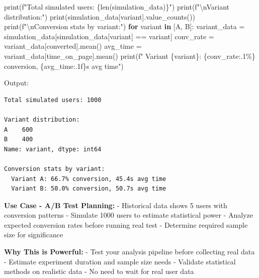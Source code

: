 \documentclass[
  letterpaper,
]{scrbook}
\newenvironment{Shaded}{\begin{snugshade}}{\end{snugshade}}
\newcommand{\BuiltInTok}[1]{\textcolor[rgb]{0.00,0.23,0.31}{#1}}
\newcommand{\CharTok}[1]{\textcolor[rgb]{0.13,0.47,0.30}{#1}}
\newcommand{\ControlFlowTok}[1]{\textcolor[rgb]{0.00,0.23,0.31}{\textbf{#1}}}
\newcommand{\KeywordTok}[1]{\textcolor[rgb]{0.00,0.23,0.31}{\textbf{#1}}}
\newcommand{\NormalTok}[1]{\textcolor[rgb]{0.00,0.23,0.31}{#1}}
\newcommand{\OperatorTok}[1]{\textcolor[rgb]{0.37,0.37,0.37}{#1}}
\newcommand{\SpecialCharTok}[1]{\textcolor[rgb]{0.37,0.37,0.37}{#1}}
\newcommand{\SpecialStringTok}[1]{\textcolor[rgb]{0.13,0.47,0.30}{#1}}
\newcommand{\StringTok}[1]{\textcolor[rgb]{0.13,0.47,0.30}{#1}}
\begin{document}
\begin{Shaded}
\begin{Highlighting}[]
\BuiltInTok{print}\NormalTok{(}\SpecialStringTok{f"Total simulated users: }\SpecialCharTok{\{}\BuiltInTok{len}\NormalTok{(simulation\_data)}\SpecialCharTok{\}}\SpecialStringTok{"}\NormalTok{)}
\BuiltInTok{print}\NormalTok{(}\SpecialStringTok{f"}\CharTok{\textbackslash{}n}\SpecialStringTok{Variant distribution:"}\NormalTok{)}
\BuiltInTok{print}\NormalTok{(simulation\_data[}\StringTok{\textquotesingle{}variant\textquotesingle{}}\NormalTok{].value\_counts())}
\BuiltInTok{print}\NormalTok{(}\SpecialStringTok{f"}\CharTok{\textbackslash{}n}\SpecialStringTok{Conversion stats by variant:"}\NormalTok{)}
\ControlFlowTok{for}\NormalTok{ variant }\KeywordTok{in}\NormalTok{ [}\StringTok{\textquotesingle{}A\textquotesingle{}}\NormalTok{, }\StringTok{\textquotesingle{}B\textquotesingle{}}\NormalTok{]:}
\NormalTok{    variant\_data }\OperatorTok{=}\NormalTok{ simulation\_data[simulation\_data[}\StringTok{\textquotesingle{}variant\textquotesingle{}}\NormalTok{] }\OperatorTok{==}\NormalTok{ variant]}
\NormalTok{    conv\_rate }\OperatorTok{=}\NormalTok{ variant\_data[}\StringTok{\textquotesingle{}converted\textquotesingle{}}\NormalTok{].mean()}
\NormalTok{    avg\_time }\OperatorTok{=}\NormalTok{ variant\_data[}\StringTok{\textquotesingle{}time\_on\_page\textquotesingle{}}\NormalTok{].mean()}
    \BuiltInTok{print}\NormalTok{(}\SpecialStringTok{f"  Variant }\SpecialCharTok{\{}\NormalTok{variant}\SpecialCharTok{\}}\SpecialStringTok{: }\SpecialCharTok{\{}\NormalTok{conv\_rate}\SpecialCharTok{:.1\%\}}\SpecialStringTok{ conversion, }\SpecialCharTok{\{}\NormalTok{avg\_time}\SpecialCharTok{:.1f\}}\SpecialStringTok{s avg time"}\NormalTok{)}
\end{Highlighting}
\end{Shaded}

Output:

\begin{verbatim}
Total simulated users: 1000

Variant distribution:
A    600
B    400
Name: variant, dtype: int64

Conversion stats by variant:
  Variant A: 66.7% conversion, 45.4s avg time
  Variant B: 50.0% conversion, 50.7s avg time
\end{verbatim}

\textbf{Use Case - A/B Test Planning:} - Historical data shows 5 users
with conversion patterns - Simulate 1000 users to estimate statistical
power - Analyze expected conversion rates before running real test -
Determine required sample size for significance

\textbf{Why This is Powerful:} - Test your analysis pipeline before
collecting real data - Estimate experiment duration and sample size
needs - Validate statistical methods on realistic data - No need to wait
for real user data
\end{document}
